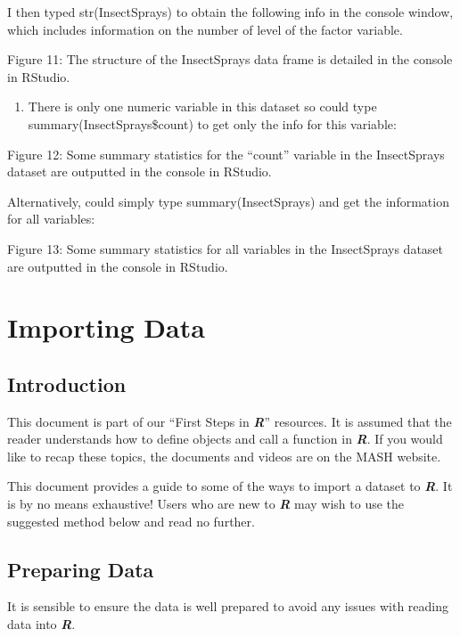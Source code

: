 \documentclass[
]{book}
\providecommand{\tightlist}{%
  \setlength{\itemsep}{0pt}\setlength{\parskip}{0pt}}
\begin{document}
I then typed str(InsectSprays) to obtain the following info in the console window, which includes information on the number of level of the factor variable.

Figure 11: The structure of the InsectSprays data frame is detailed in the console in RStudio.

\begin{enumerate}
\def\labelenumi{\alph{enumi})}
\setcounter{enumi}{3}
\tightlist
\item
  There is only one numeric variable in this dataset so could type summary(InsectSprays\$count) to get only the info for this variable:
\end{enumerate}

Figure 12: Some summary statistics for the ``count'' variable in the InsectSprays dataset are outputted in the console in RStudio.

Alternatively, could simply type summary(InsectSprays) and get the information for all variables:

Figure 13: Some summary statistics for all variables in the InsectSprays dataset are outputted in the console in RStudio.

\chapter{Importing Data}\label{importing-data}

\section{Introduction}\label{introduction-9}

This document is part of our ``First Steps in \textbf{\emph{R}}'' resources. It is assumed that the reader understands how to define objects and call a function in \textbf{\emph{R}}. If you would like to recap these topics, the documents and videos are on the MASH website.

This document provides a guide to some of the ways to import a dataset to \textbf{\emph{R}}. It is by no means exhaustive! Users who are new to \textbf{\emph{R}} may wish to use the suggested method below and read no further.

\section{Preparing Data}\label{preparing-data}

It is sensible to ensure the data is well prepared to avoid any issues with reading data into \textbf{\emph{R}}.
\end{document}
